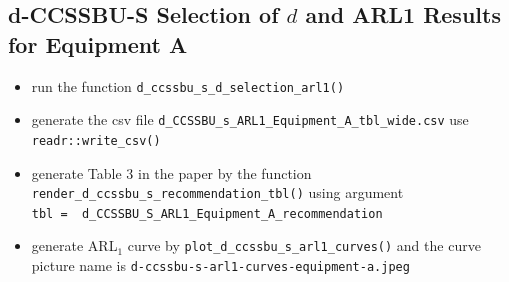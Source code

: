 \documentclass[
  11pt,
  letterpaper,
  DIV=11,
  numbers=noendperiod]{scrartcl}
\providecommand{\tightlist}{%
  \setlength{\itemsep}{0pt}\setlength{\parskip}{0pt}}
\begin{document}
\subsection{\texorpdfstring{d-CCSSBU-S Selection of \(d\) and ARL1
Results for Equipment
A}{d-CCSSBU-S Selection of d and ARL1 Results for Equipment A}}\label{d-ccssbu-s-selection-of-d-and-arl1-results-for-equipment-a}

\begin{itemize}
\tightlist
\item
  run the function \texttt{d\_ccssbu\_s\_d\_selection\_arl1()}
\item
  generate the csv file
  \texttt{d\_CCSSBU\_s\_ARL1\_Equipment\_A\_tbl\_wide.csv} use
  \texttt{readr::write\_csv()}
\item
  generate Table 3 in the paper by the function
  \texttt{render\_d\_ccssbu\_s\_recommendation\_tbl()} using argument
  \texttt{tbl\ =\ \ d\_CCSSBU\_S\_ARL1\_Equipment\_A\_recommendation}
\item
  generate ARL\(_1\) curve by
  \texttt{plot\_d\_ccssbu\_s\_arl1\_curves()} and the curve picture name
  is \texttt{d-ccssbu-s-arl1-curves-equipment-a.jpeg}
\end{itemize}

\begin{table}[!h]
\centering
\caption{\label{tab:d-ccssbu-s-recommendation-equipment-a}Recommended d values for the d-CCSSBU-S chart for Equipment A.}
\centering
{}
\end{table}
\end{document}
